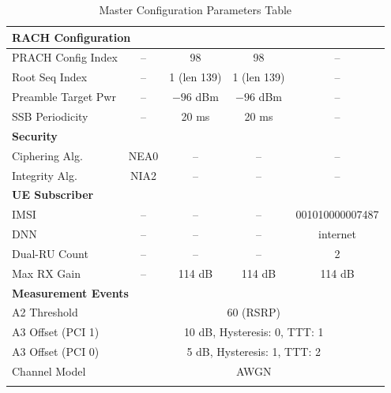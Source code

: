 \begin{longtable}{|p{4cm}|c|c|c|c|}
\multicolumn{5}{|l|}{\textbf{RACH Configuration}} \\ \hline
PRACH Config Index & -- & 98 & 98 & -- \\ \hline
Root Seq Index & -- & 1 (len 139) & 1 (len 139) & -- \\ \hline
Preamble Target Pwr & -- & $-96$ dBm & $-96$ dBm & -- \\ \hline
SSB Periodicity & -- & 20 ms & 20 ms & -- \\ \hline

\multicolumn{5}{|l|}{\textbf{Security}} \\ \hline
Ciphering Alg. & NEA0 & -- & -- & -- \\ \hline
Integrity Alg. & NIA2 & -- & -- & -- \\ \hline

\multicolumn{5}{|l|}{\textbf{UE Subscriber}} \\ \hline
IMSI & -- & -- & -- & 001010000007487 \\ \hline
DNN & -- & -- & -- & internet \\ \hline
Dual-RU Count & -- & -- & -- & 2 \\ \hline
Max RX Gain & -- & 114 dB & 114 dB & 114 dB \\ \hline

\multicolumn{5}{|l|}{\textbf{Measurement Events}} \\ \hline
A2 Threshold & \multicolumn{4}{c|}{60 (RSRP)} \\ \hline
A3 Offset (PCI 1) & \multicolumn{4}{c|}{10 dB, Hysteresis: 0, TTT: 1} \\ \hline
A3 Offset (PCI 0) & \multicolumn{4}{c|}{5 dB, Hysteresis: 1, TTT: 2} \\ \hline
Channel Model & \multicolumn{4}{c|}{AWGN} \\ \hline

\caption{Master Configuration Parameters Table}
\label{tab:params}
\end{longtable}

